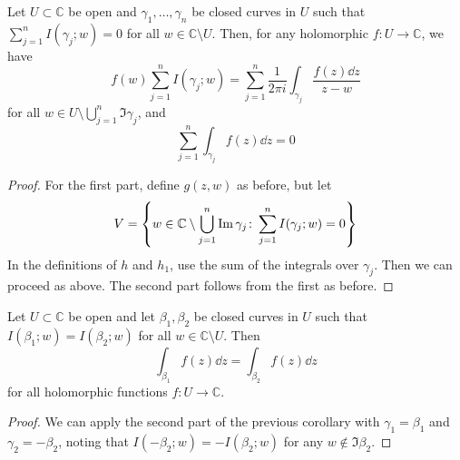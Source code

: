 \begin{corollary}
	Let \( U \subset \mathbb C \) be open and \( \gamma_1, \dots, \gamma_n \) be closed curves in \( U \) such that \( \sum_{j=1}^n I(\gamma_j;w) = 0 \) for all \( w \in \mathbb C \setminus U \).
	Then, for any holomorphic \( f \colon U \to \mathbb C \), we have
	\[
		f(w) \sum_{j=1}^n I(\gamma_j;w) = \sum_{j=1}^n \frac{1}{2\pi i} \int_{\gamma_j} \frac{f(z) \dd{z}}{z-w}
	\]
	for all \( w \in U \setminus \bigcup_{j=1}^n \Im \gamma_j \), and
	\[
		\sum_{j=1}^n \int_{\gamma_j} f(z) \dd{z} = 0
	\]
\end{corollary}
\begin{proof}
	For the first part, define \( g(z,w) \) as before, but let
	\[
		V = \qty{w \in \mathbb C \setminus \bigcup_{j=1}^n \operatorname{Im}\gamma_j \colon \sum_{j=1}^n I(\gamma_j;w) = 0}
	\]
	In the definitions of \( h \) and \( h_1 \), use the sum of the integrals over \( \gamma_j \).
	Then we can proceed as above.
	The second part follows from the first as before.
\end{proof}
\begin{corollary}
	Let \( U \subset \mathbb C \) be open and let \( \beta_1, \beta_2 \) be closed curves in \( U \) such that \( I(\beta_1;w) = I(\beta_2;w) \) for all \( w \in \mathbb C \setminus U \).
	Then
	\[
		\int_{\beta_1} f(z) \dd{z} = \int_{\beta_2} f(z) \dd{z}
	\]
	for all holomorphic functions \( f \colon U \to \mathbb C \).
\end{corollary}
\begin{proof}
	We can apply the second part of the previous corollary with \( \gamma_1 = \beta_1 \) and \( \gamma_2 = -\beta_2 \), noting that \( I(-\beta_2;w) = -I(\beta_2;w) \) for any \( w \not\in \Im \beta_2 \).
\end{proof}

